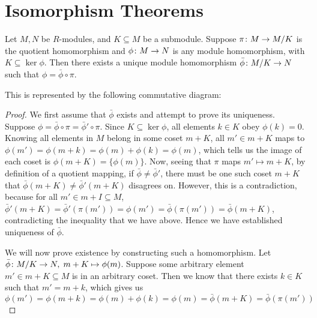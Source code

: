\section{Isomorphism Theorems}

\begin{theorem}\label{thm:univ-prop-quotient-mod}
    Let \(M,N\) be \(R\)-modules, and \(K \subseteq M\) be a submodule.
    Suppose \(\pi\colon M\to M/K\) is the quotient homomorphism
    and \(\phi\colon M\to N\) is any module homomorphism, with \(K \subseteq \ker\phi\).
    Then there exists a unique module homomorphism \(\bar{\phi}\colon M/K\to N\)
    such that \(\phi = \bar{\phi}\circ\pi\).

    This is represented by the following commutative diagram:
    \begin{center}
    \end{center}
\end{theorem}
\begin{proof}
    We first assume that \(\bar{\phi}\) exists and attempt to prove its uniqueness.
    Suppose \(\phi = \bar{\phi}\circ\pi = \bar{\phi}'\circ\pi\).
    Since \(K \subseteq \ker\phi\),
    all elements \(k \in K\) obey \(\phi(k) = 0\).
    Knowing all elements in \(M\) belong in some coset \(m+K\),
    all \(m' \in m+K\) maps to \(\phi(m') = \phi(m+k) = \phi(m) + \phi(k) = \phi(m)\),
    which tells us the image of each coset is \(\phi(m+K) = \{\phi(m)\}\).
    Now, seeing that \(\pi\) maps \(m' \mapsto m+K\),
    by definition of a quotient mapping,
    if \(\bar{\phi}\neq\bar{\phi}'\),
    there must be one such coset \(m+K\) that
    \(\bar{\phi}(m+K) \neq \bar{\phi}'(m+K)\) disagrees on.
    However, this is a contradiction,
    because for all \(m' \in m+I \subseteq M\),
    \(\bar{\phi}'(m+K) = \bar{\phi}'(\pi(m')) = \phi(m') = \bar{\phi}(\pi(m')) = \bar{\phi}(m+K)\),
    contradicting the inequality that we have above.
    Hence we have established uniqueness of \(\bar{\phi}\).

    We will now prove existence by constructing such a homomorphism.
    Let \(\bar{\phi}\colon M/K\to N,\;m+K\mapsto\phi(m)\).
    Suppose some arbitrary element \(m' \in m+K \subseteq M\) is in an arbitrary coset.
    Then we know that there exists \(k \in K\) such that \(m' = m+k\),
    which gives us
    \begin{equation*}
        \phi(m') = \phi(m+k) = \phi(m)+\phi(k) = \phi(m)
        = \bar{\phi}(m+K) = \bar{\phi}(\pi(m'))
    \end{equation*}
\end{proof}

